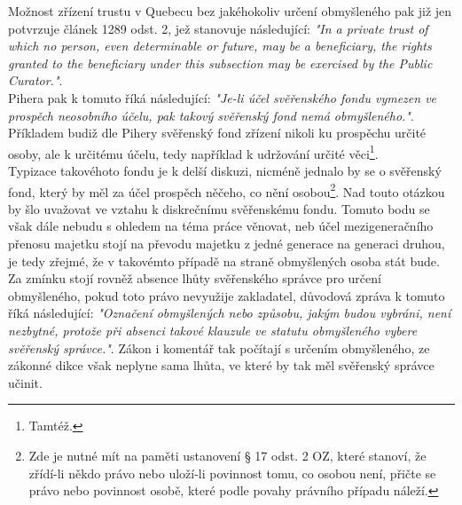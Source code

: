 \documentclass{article}
\begin{document}
Možnost zřízení trustu v Quebecu bez jakéhokoliv určení obmyšleného pak již jen potvrzuje článek 1289 odst. 2, jež stanovuje následující: \textit{"In a private trust of which no person, even determinable or future, may be a beneficiary, the rights granted to the beneficiary under this subsection may be exercised by the Public Curator."}.\\

Pihera pak k tomuto říká následující: \textit{"Je-li účel svěřenského fondu vymezen ve prospěch neosobního účelu, pak takový svěřenský fond nemá obmyšleného."}. Příkladem budiž dle Pihery svěřenský fond zřízení nikoli ku prospěchu určité osoby, ale k určitému účelu, tedy například k udržování určité věci\footnote{Tamtéž.}.\\

Typizace takovéhoto fondu je k delší diskuzi, nicméně jednalo by se o svěřenský fond, který by měl za účel prospěch něčeho, co nění osobou\footnote{Zde je nutné mít na paměti ustanovení § 17 odst. 2 OZ, které stanoví, že zřídí-li někdo právo nebo uloží-li povinnost tomu, co osobou není, přičte se právo nebo povinnost osobě, které podle povahy právního případu náleží.}. Nad touto otázkou by šlo uvažovat ve vztahu k diskrečnímu svěřenskému fondu. Tomuto bodu se však dále nebudu s ohledem na téma práce věnovat, neb účel mezigeneračního přenosu majetku stojí na převodu majetku z jedné generace na generaci druhou, je tedy zřejmé, že v takovémto případě na straně obmyšlených osoba stát bude.\\

Za zmínku stojí rovněž absence lhůty svěřenského správce pro určení obmyšleného, pokud toto právo nevyužije zakladatel, důvodová zpráva k tomuto říká následující: \textit{"Označení obmyšlených nebo způsobu, jakým budou vybráni, není nezbytné, protože při absenci takové klauzule ve statutu obmyšleného vybere svěřenský správce."}. Zákon i komentář tak počítají s určením obmyšleného, ze zákonné dikce však neplyne sama lhůta, ve které by tak měl svěřenský správce učinit.\\




\end{document}
